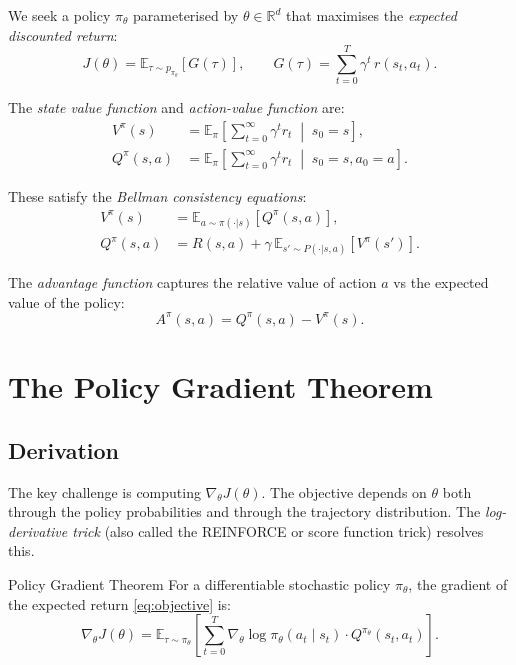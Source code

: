 \documentclass[11pt, a4paper]{article}
\newcommand{\R}{\mathbb{R}}
\newcommand{\E}{\mathbb{E}}
\newcommand{\grad}{\nabla}
\begin{document}
We seek a policy $\pi_\theta$ parameterised by $\theta \in \R^d$ that maximises
the \emph{expected discounted return}:
\begin{equation}
    J(\theta) = \E_{\tau \sim p_{\pi_\theta}} \left[ G(\tau) \right], \qquad
    G(\tau) = \sum_{t=0}^{T} \gamma^t \, r(s_t, a_t).
    \label{eq:objective}
\end{equation}

The \emph{state value function} and \emph{action-value function} are:
\begin{align}
    V^{\pi}(s) &= \E_\pi \left[ \sum_{t=0}^{\infty} \gamma^t r_t \;\middle|\; s_0 = s \right], \\
    Q^{\pi}(s, a) &= \E_\pi \left[ \sum_{t=0}^{\infty} \gamma^t r_t \;\middle|\; s_0 = s, a_0 = a \right].
\end{align}

These satisfy the \emph{Bellman consistency equations}:
\begin{align}
    V^\pi(s) &= \E_{a \sim \pi(\cdot|s)} \left[ Q^\pi(s, a) \right], \\
    Q^\pi(s, a) &= R(s, a) + \gamma \, \E_{s' \sim P(\cdot|s,a)} \left[ V^\pi(s') \right].
    \label{eq:bellman}
\end{align}

The \emph{advantage function} captures the relative value of action $a$ vs the
expected value of the policy:
\begin{equation}
    A^\pi(s, a) = Q^\pi(s, a) - V^\pi(s).
\end{equation}

\section{The Policy Gradient Theorem}
\label{sec:pg}

\subsection{Derivation}

The key challenge is computing $\grad_\theta J(\theta)$.
The objective depends on $\theta$ both through the policy probabilities and through
the trajectory distribution.
The \emph{log-derivative trick} (also called the REINFORCE or score function trick)
resolves this.

\begin{theorem}{Policy Gradient Theorem \citep{sutton1999}}{}
For a differentiable stochastic policy $\pi_\theta$, the gradient of the
expected return \eqref{eq:objective} is:
\begin{equation}
    \grad_\theta J(\theta) = \E_{\tau \sim \pi_\theta} \left[
        \sum_{t=0}^{T} \grad_\theta \log \pi_\theta(a_t \mid s_t) \cdot Q^{\pi_\theta}(s_t, a_t)
    \right].
    \label{eq:pg_theorem}
\end{equation}
\end{theorem}
\end{document}
